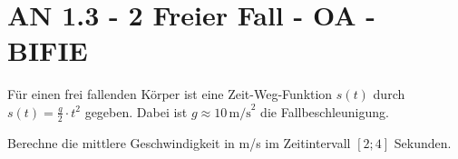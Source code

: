 \section{AN 1.3 - 2 Freier Fall - OA - BIFIE}


\begin{beispiel}[AN 1.3]{1} %
Für einen frei fallenden Körper ist eine Zeit-Weg-Funktion $s(t)$ durch $s(t) = \frac{g}{2} \cdot t^2$ gegeben. Dabei ist $g \approx 10\,\text{m/s}^2$ die Fallbeschleunigung. 

\leer

Berechne die mittlere Geschwindigkeit in m/s im Zeitintervall $[2;4]$ Sekunden.

\end{beispiel}